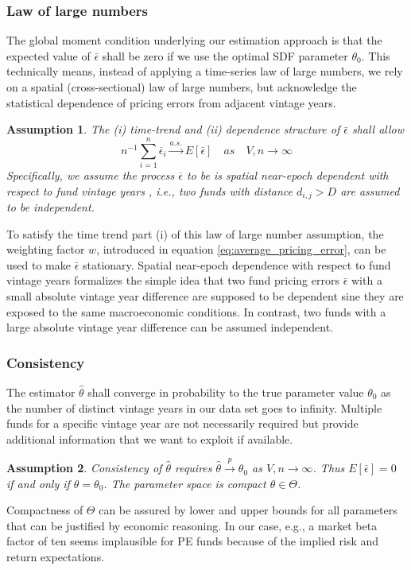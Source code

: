 \documentclass[12pt]{article}
\newtheorem{assume}{Assumption}
\begin{document}
\subsubsection{Law of large numbers}
The global moment condition underlying our estimation approach is that the expected value of $\bar{\epsilon}$ shall be zero if we use the optimal SDF parameter $\theta_0$. 
This technically means, instead of applying a time-series law of large numbers, we rely on a spatial (cross-sectional) law of large numbers, but acknowledge the statistical dependence of  pricing errors from adjacent vintage years.

\begin{assume}
	\label{as:lln}
	The (i) time-trend and (ii) dependence structure of $\bar{\epsilon}$ shall allow
	\[
	n^{-1} \sum_{i=1}^n \overline{\epsilon}_i \overset{a.s.}\to E[\bar{\epsilon}]
	\quad {as} \quad V,n \to \infty
	\]
	Specifically, we assume the process $\overline{\epsilon}$ to be is spatial near-epoch dependent with respect to fund vintage years \citep{JP12}, i.e., two funds with distance $d_{i,j}>D$ are assumed to be independent.
\end{assume}
To satisfy the time trend part (i) of this law of large number assumption, the weighting factor $w$, introduced in equation \ref{eq:average_pricing_error}, can be used to make $\bar{\epsilon}$ stationary.
Spatial near-epoch dependence with respect to fund vintage years formalizes the simple idea that two fund pricing errors $\bar{\epsilon}$ with a small absolute vintage year difference are supposed to be dependent sine they are exposed to the same macroeconomic conditions.
In contrast, two funds with a large absolute vintage year difference can be assumed independent.

\subsubsection{Consistency}
The estimator $\hat{\theta}$ shall converge in probability to the true parameter value $\theta_0$ as the number of distinct vintage years in our data set goes to infinity.
Multiple funds for a specific vintage year are not necessarily required but provide additional information that we want to exploit if available.

\begin{assume}
\label{as:consistency}
 Consistency of $\hat{\theta}$ requires $\hat{\theta} \overset{p}{\to} \theta_0$ as $V,n \to \infty$.
 Thus $E[\bar{\epsilon}]=0$ if and only if $\theta=\theta_0$.
 The parameter space is compact $\theta \in \Theta$.
\end{assume}
Compactness of $\Theta$ can be assured by lower and upper bounds for all parameters that can be justified by economic reasoning. In our case, e.g., a market beta factor of ten seems implausible for PE funds because of the implied risk and return expectations.
\end{document}
